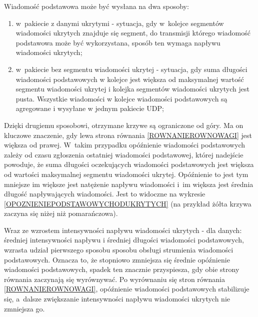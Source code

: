 \documentclass[a4paper, twoside, 12pt]{report}
\begin{document}
            Wiadomość podstawowa może być wysłana na dwa sposoby:
            \begin{enumerate}
                \item w~pakiecie z danymi ukrytymi - sytuacja, gdy w~kolejce
                    segmentów wiadomości ukrytych znajduje się segment, do transmisji którego
                    wiadomość podstawowa może być wykorzystana, sposób ten wymaga
                    napływu wiadomości ukrytych;
                \item w~pakiecie bez segmentu wiadomości ukrytej - sytuacja, gdy suma długości wiadomości
                    podstawowych w kolejce jest większa od
                    maksymalnej wartość segmentu wiadomości ukrytej i kolejka segmentów wiadomości
                    ukrytych jest pusta. Wszystkie wiadomości w kolejce wiadomości
                    podstawowych są agregowane i wysyłane w jednym pakiecie UDP;
            \end{enumerate}

            Dzięki drugiemu sposobowi, otrzymane krzywe są ograniczone od góry.
            Ma on kluczowe znaczenie, gdy lewa strona równania \ref{ROWNANIEROWNOWAGI} jest większa od prawej.
            W~takim przypadku
            opóźnienie wiadomości podstawowych zależy od czasu zgłoszenia ostatniej
            wiadomości podstawowej, której nadejście powoduje, że suma długości oczekujących
            wiadomości podstawowych jest większa od wartości maksymalnej segmentu wiadomości ukrytej.
            Opóźnienie to jest tym mniejsze im większe jest natężenie napływu wiadomości
            i~im większa jest średnia długość napływających wiadomości. Jest to widoczne na wykresie
            \ref{OPOZNIENIEPODSTAWOWYCHODUKRYTYCH} (na przykład żółta krzywa zaczyna
            się niżej niż pomarańczowa).

            Wraz ze wzrostem intensywności napływu wiadomości ukrytych - dla danych:
            średniej intensywności napływu i średniej długości wiadomości podstawowych, wzrasta udział
            pierwszego sposobu sposobu obsługi strumienia wiadomości podstawowych.
            Oznacza to, że stopniowo zmniejsza się średnie opóźnienie wiadomości podstawowych,
            spadek ten znacznie przyspiesza, gdy obie strony równania zaczynają się wyrównywać.
            Po wyrównaniu się stron równania \ref{ROWNANIEROWNOWAGI},
            opóźnienie wiadomości podstawowych stabilizuje się, a~dalsze zwiększanie
            intensywności napływu wiadomości ukrytych nie zmniejsza go.
\end{document}
